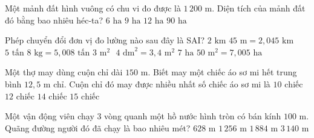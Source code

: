 \begin{ex} %
Một mảnh đất hình vuông có chu vi đo được là $1\,200\text{ m}$. Diện tích của mảnh đất đó bằng bao nhiêu héc-ta?
\choice
{$6\text{ ha}$}
{\True $9\text{ ha}$}
{$12\text{ ha}$}
{$90\text{ ha}$}
\end{ex}

\begin{ex} %
Phép chuyển đổi đơn vị đo lường nào sau đây là SAI?
\choice
{$2\text{ km }45\text{ m} = 2{,}045\text{ km}$}
{$5\text{ tấn }8\text{ kg} = 5{,}008\text{ tấn}$}
{\True $3\text{ m}^2\text{ }4\text{ dm}^2 = 3{,}4\text{ m}^2$}
{$7\text{ ha }50\text{ m}^2 = 7{,}005\text{ ha}$}
\end{ex}

\begin{ex} %
Một thợ may dùng cuộn chỉ dài $150\text{ m}$. Biết may một chiếc áo sơ mi hết trung bình $12{,}5\text{ m}$ chỉ. Cuộn chỉ đó may được nhiều nhất số chiếc áo sơ mi là
\choice
{$10\text{ chiếc}$}
{\True $12\text{ chiếc}$}
{$14\text{ chiếc}$}
{$15\text{ chiếc}$}
\end{ex}

\begin{ex} %
Một vận động viên chạy 3 vòng quanh một hồ nước hình tròn có bán kính $100\text{ m}$. Quãng đường người đó đã chạy là bao nhiêu mét?
\choice
{$628\text{ m}$}
{$1\,256\text{ m}$}
{\True $1\,884\text{ m}$}
{$3\,140\text{ m}$}
\end{ex}

